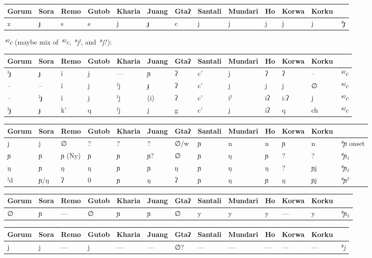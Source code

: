 \documentclass[a4paper,]{article}
\begin{document}
\begin{longtable}[]{@{}lllllllllllll@{}}
\toprule
Gorum & Sora & Remo & Gutob & Kharia & Juang & Gtaʔ & Santali & Mundari
& Ho & Korwa & Korku &\tabularnewline
\midrule
\endhead
z & ɟ & s & s & j & ɟ & c & j & j & j & j & j & \emph{*ɟ}\tabularnewline
\bottomrule
\end{longtable}

\emph{*ˀc} (maybe mix of \emph{*ˀc}, \emph{*jˀ}, and \emph{*j}?):

\begin{longtable}[]{@{}lllllllllllll@{}}
\toprule
Gorum & Sora & Remo & Gutob & Kharia & Juang & Gtaʔ & Santali & Mundari
& Ho & Korwa & Korku &\tabularnewline
\midrule
\endhead
ˀɟ & ɟ & ĭ & j & --- & ɲ & ʔ & c' & j & ʔ & ʔ & -- &
\emph{*ˀc}\tabularnewline
-- & -- & ĭ & j & ˀj & ɟ & ʔ & c' & j & j & j & ∅ &
\emph{*ˀc}\tabularnewline
-- & ˀɟ & ĭ & j & ˀj & (i) & ʔ & c' & iˀ & iʔ & i:ʔ & j &
\emph{*ˀc}\tabularnewline
ˀɟ & ɟ & k' & q & ˀj & j & g & c' & j & iʔ & q & ch &
\emph{*ˀc}\tabularnewline
\bottomrule
\end{longtable}

\begin{longtable}[]{@{}lllllllllllll@{}}
\toprule
Gorum & Sora & Remo & Gutob & Kharia & Juang & Gtaʔ & Santali & Mundari
& Ho & Korwa & Korku &\tabularnewline
\midrule
\endhead
j & j & ∅ & ? & ? & ? & ∅/w & ɲ & n & n & ɲ & n & \emph{*ɲ}
onset\tabularnewline
ɲ & ɲ & ɲ (Ny) & ɲ & ɲ & ɲ? & ∅ & ɲ & ŋ & ɲ & ? & ? &
\emph{*ɲ₁}\tabularnewline
ŋ & ɲ & ŋ & ŋ & ɲ & ɲ & ŋ & ɲ & ŋ & ŋ & ? & ɲj &
\emph{*ɲ₂}\tabularnewline
ˀd & ɲ/ŋ & ʔ & 0 & ɲ & ŋ & ʔ & ɲ & ŋ & ɲ & ŋ & ɲj &
\emph{*ɲˀ}\tabularnewline
\bottomrule
\end{longtable}

\begin{longtable}[]{@{}lllllllllllll@{}}
\toprule
Gorum & Sora & Remo & Gutob & Kharia & Juang & Gtaʔ & Santali & Mundari
& Ho & Korwa & Korku &\tabularnewline
\midrule
\endhead
∅ & ɲ & --- & ∅ & ɲ & ɲ & ∅ & y & y & y & --- & y &
\emph{*ɲ₃}\tabularnewline
\bottomrule
\end{longtable}

\begin{longtable}[]{@{}lllllllllllll@{}}
\toprule
Gorum & Sora & Remo & Gutob & Kharia & Juang & Gtaʔ & Santali & Mundari
& Ho & Korwa & Korku &\tabularnewline
\midrule
\endhead
j & j & --- & j & --- & --- & ∅? & --- & --- & --- & --- & --- &
\emph{*j}\tabularnewline
\bottomrule
\end{longtable}
\end{document}
